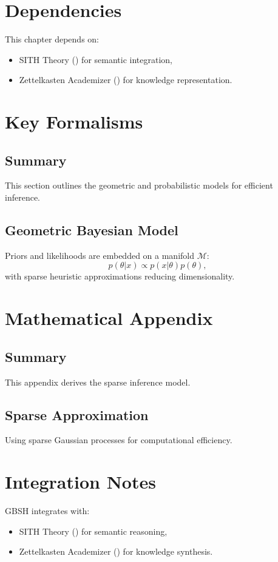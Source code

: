 \documentclass[11pt,oneside]{memoir}
\theoremstyle{plain}
\begin{document}
\section{Dependencies}
This chapter depends on:
\begin{itemize}
    \item SITH Theory () for semantic integration,
    \item Zettelkasten Academizer () for knowledge representation.
\end{itemize}

\section{Key Formalisms}
\subsection{Summary}
This section outlines the geometric and probabilistic models for efficient inference.

\subsection{Geometric Bayesian Model}
Priors and likelihoods are embedded on a manifold \(\mathcal{M}\):
\begin{equation}
    p(\theta | x) \propto p(x | \theta) p(\theta),
\end{equation}
with sparse heuristic approximations reducing dimensionality.

\section{Mathematical Appendix}
\subsection{Summary}
This appendix derives the sparse inference model.

\subsection{Sparse Approximation}
Using sparse Gaussian processes for computational efficiency.

\section{Integration Notes}
GBSH integrates with:
\begin{itemize}
    \item SITH Theory () for semantic reasoning,
    \item Zettelkasten Academizer () for knowledge synthesis.
\end{itemize}
\end{document}
